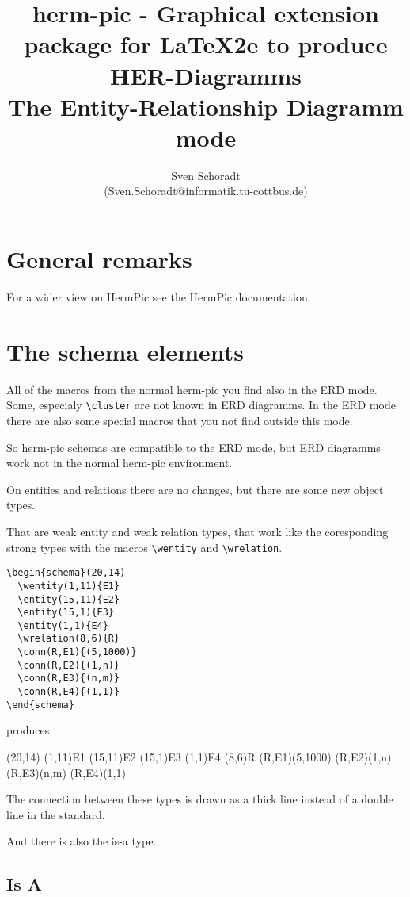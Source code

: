 \documentclass[a4paper,11pt]{article}
\author{Sven Schoradt \\ (Sven.Schoradt@informatik.tu-cottbus.de)}
\title{herm-pic - Graphical extension package for LaTeX2e to produce HER-Diagramms\\The Entity-Relationship Diagramm mode}
\begin{document}
\maketitle

\section{General remarks}

For a wider view on HermPic see the HermPic documentation.

\section{The schema elements}

All of the macros from the normal herm-pic you find also in the ERD mode.
Some, especialy \verb|\cluster| are not known in ERD diagramms. In the ERD mode there are also some special macros that you not find outside this mode.

So herm-pic schemas are compatible to the ERD mode, but ERD diagramms work not in the normal herm-pic environment.

On entities and relations there are no changes, but there are some new 
object types.

That are weak entity and weak relation types, that work like the coresponding strong types with the macros \verb|\wentity| and \verb|\wrelation|.

\begin{verbatim}
\begin{schema}(20,14)
  \wentity(1,11){E1}
  \entity(15,11){E2}
  \entity(15,1){E3}
  \entity(1,1){E4}
  \wrelation(8,6){R}
  \conn(R,E1){(5,1000)}
  \conn(R,E2){(1,n)}
  \conn(R,E3){(n,m)}
  \conn(R,E4){(1,1)}
\end{schema}
\end{verbatim}

produces

\begin{schema}(20,14)
  \wentity(1,11){E1}
  \entity(15,11){E2}
  \entity(15,1){E3}
  \entity(1,1){E4}
  \wrelation(8,6){R}
  \conn(R,E1){(5,1000)}
  \conn(R,E2){(1,n)}
  \conn(R,E3){(n,m)}
  \conn(R,E4){(1,1)}
\end{schema}

The connection between these types is drawn as a thick line instead of a 
double line in the standard.

And there is also the is-a type. 

\subsection{Is A}
\end{document}
